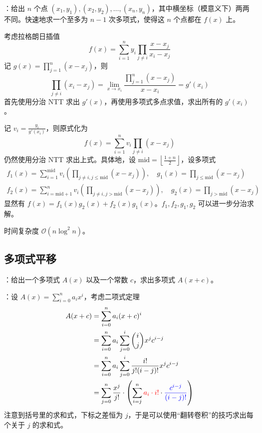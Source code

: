 ：给出 $n$ 个点 $(x_1, y_1), (x_2, y_2), \dots, (x_n, y_n)$，其中横坐标（模意义下）两两不同。快速地求一个至多为 $n - 1$ 次多项式，使得这 $n$ 个点都在 $f(x)$ 上。

考虑拉格朗日插值
\[
f(x) = \sum\limits_{i = 1}^{n}y_i \prod\limits_{j \neq i} \frac{x - x_j}{x_i - x_j}
\]
记 $g(x) = \prod_{j = 1}^n(x - x_j)$，则
\[
\prod_{j \neq i} (x_i - x_j) = \lim_{x \to x_i} \frac{\prod_{j = 1}^n (x - x_j)}{x - x_i} = g'(x_i)
\]
首先使用分治 NTT 求出 $g'(x)$，再使用多项式多点求值，求出所有的 $g'(x_i)$。

记 $v_i = \frac{y_i}{g'(x_i)}$，则原式化为
\[
f(x) = \sum\limits_{i = 1}^n v_i \prod\limits_{j \neq i} (x - x_j)
\]
仍然使用分治 NTT 求出上式。具体地，设 $\mathrm{mid} = \left\lfloor \frac{1 + n}{2} \right\rfloor$，设多项式
\[
\begin{gathered}
f_1(x) = \sum\limits_{i = 1}^\mathrm{mid} v_i \left( \prod\limits_{j \neq i, j \leq \mathrm{mid}} (x - x_j) \right), \quad g_1(x) = \prod\limits_{j \leq \mathrm{mid}} (x - x_j) \\
f_2(x) = \sum\limits_{i = \mathrm{mid} + 1}^n v_i \left( \prod\limits_{j \neq i, j > \mathrm{mid}} (x - x_j) \right), \quad g_2(x) = \prod\limits_{j > \mathrm{mid}} (x - x_j)
\end{gathered}
\]
显然有 $f(x) = f_1(x)g_2(x) + f_2(x)g_1(x)$。$f_1, f_2, g_1, g_2$ 可以进一步分治求解。

时间复杂度 $\mathcal{O}(n \log^2 n)$。

\subsection{多项式平移}

：给出一个多项式 $A(x)$ 以及一个常数 $c$，求出多项式 $A(x + c)$。

：设 $A(x) = \sum_{i = 0}^n a_ix^i$，考虑二项式定理
\[
\begin{aligned}
A(x + c) & = \sum_{i = 0}^n a_i(x + c)^i \\
& = \sum_{i = 0}^n a_i \sum_{j = 0}^i \binom{i}{j}x^jc^{i - j} \\
& = \sum_{i = 0}^n a_i \sum_{j = 0}^i \frac{i!}{j!(i - j)!}x^jc^{i - j} \\
& = \sum_{j = 0}^n \frac{x^j}{j!} \cdot \left( \sum_{i = j}^n {\color{red} a_i \cdot i!} \cdot {\color{blue} \frac{c^{i - j}}{(i - j)!}} \right) \\
\end{aligned}
\]
注意到括号里的求和式，下标之差恒为 $j$，于是可以使用“翻转卷积”的技巧求出每个关于 $j$ 的求和式。

